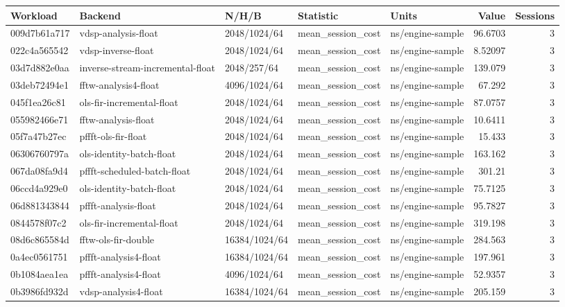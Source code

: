 \begingroup\scriptsize
\begin{longtable}{lllllrr}
Workload & Backend & N/H/B & Statistic & Units & Value & Sessions \\
\hline
009d7b61a717 & vdsp-analysis-float & 2048/1024/64 & mean\_session\_cost & ns/engine-sample & 96.6703 & 3 \\
022c4a565542 & vdsp-inverse-float & 2048/1024/64 & mean\_session\_cost & ns/engine-sample & 8.52097 & 3 \\
03d7d882e0aa & inverse-stream-incremental-float & 2048/257/64 & mean\_session\_cost & ns/engine-sample & 139.079 & 3 \\
03deb72494e1 & fftw-analysis4-float & 4096/1024/64 & mean\_session\_cost & ns/engine-sample & 67.292 & 3 \\
045f1ea26c81 & ols-fir-incremental-float & 2048/1024/64 & mean\_session\_cost & ns/engine-sample & 87.0757 & 3 \\
055982466e71 & fftw-analysis-float & 2048/1024/64 & mean\_session\_cost & ns/engine-sample & 10.6411 & 3 \\
05f7a47b27ec & pffft-ols-fir-float & 2048/1024/64 & mean\_session\_cost & ns/engine-sample & 15.433 & 3 \\
06306760797a & ols-identity-batch-float & 2048/1024/64 & mean\_session\_cost & ns/engine-sample & 163.162 & 3 \\
067da08fa9d4 & pffft-scheduled-batch-float & 2048/1024/64 & mean\_session\_cost & ns/engine-sample & 301.21 & 3 \\
06ccd4a929e0 & ols-identity-batch-float & 2048/1024/64 & mean\_session\_cost & ns/engine-sample & 75.7125 & 3 \\
06d881343844 & pffft-analysis-float & 2048/1024/64 & mean\_session\_cost & ns/engine-sample & 95.7827 & 3 \\
0844578f07c2 & ols-fir-incremental-float & 2048/1024/64 & mean\_session\_cost & ns/engine-sample & 319.198 & 3 \\
08d6c865584d & fftw-ols-fir-double & 16384/1024/64 & mean\_session\_cost & ns/engine-sample & 284.563 & 3 \\
0a4ec0561751 & pffft-analysis4-float & 16384/1024/64 & mean\_session\_cost & ns/engine-sample & 197.961 & 3 \\
0b1084aea1ea & pffft-analysis4-float & 4096/1024/64 & mean\_session\_cost & ns/engine-sample & 52.9357 & 3 \\
0b3986fd932d & vdsp-analysis4-float & 16384/1024/64 & mean\_session\_cost & ns/engine-sample & 205.159 & 3 \\

\end{longtable}
